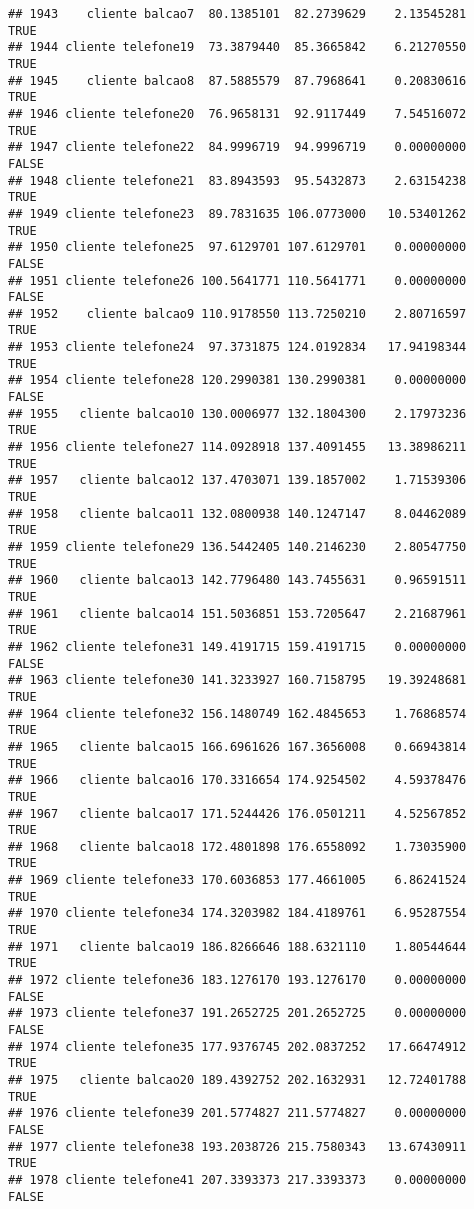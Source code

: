 \documentclass[
]{article}
\begin{document}
\begin{verbatim}
## 1943    cliente balcao7  80.1385101  82.2739629    2.13545281     TRUE
## 1944 cliente telefone19  73.3879440  85.3665842    6.21270550     TRUE
## 1945    cliente balcao8  87.5885579  87.7968641    0.20830616     TRUE
## 1946 cliente telefone20  76.9658131  92.9117449    7.54516072     TRUE
## 1947 cliente telefone22  84.9996719  94.9996719    0.00000000    FALSE
## 1948 cliente telefone21  83.8943593  95.5432873    2.63154238     TRUE
## 1949 cliente telefone23  89.7831635 106.0773000   10.53401262     TRUE
## 1950 cliente telefone25  97.6129701 107.6129701    0.00000000    FALSE
## 1951 cliente telefone26 100.5641771 110.5641771    0.00000000    FALSE
## 1952    cliente balcao9 110.9178550 113.7250210    2.80716597     TRUE
## 1953 cliente telefone24  97.3731875 124.0192834   17.94198344     TRUE
## 1954 cliente telefone28 120.2990381 130.2990381    0.00000000    FALSE
## 1955   cliente balcao10 130.0006977 132.1804300    2.17973236     TRUE
## 1956 cliente telefone27 114.0928918 137.4091455   13.38986211     TRUE
## 1957   cliente balcao12 137.4703071 139.1857002    1.71539306     TRUE
## 1958   cliente balcao11 132.0800938 140.1247147    8.04462089     TRUE
## 1959 cliente telefone29 136.5442405 140.2146230    2.80547750     TRUE
## 1960   cliente balcao13 142.7796480 143.7455631    0.96591511     TRUE
## 1961   cliente balcao14 151.5036851 153.7205647    2.21687961     TRUE
## 1962 cliente telefone31 149.4191715 159.4191715    0.00000000    FALSE
## 1963 cliente telefone30 141.3233927 160.7158795   19.39248681     TRUE
## 1964 cliente telefone32 156.1480749 162.4845653    1.76868574     TRUE
## 1965   cliente balcao15 166.6961626 167.3656008    0.66943814     TRUE
## 1966   cliente balcao16 170.3316654 174.9254502    4.59378476     TRUE
## 1967   cliente balcao17 171.5244426 176.0501211    4.52567852     TRUE
## 1968   cliente balcao18 172.4801898 176.6558092    1.73035900     TRUE
## 1969 cliente telefone33 170.6036853 177.4661005    6.86241524     TRUE
## 1970 cliente telefone34 174.3203982 184.4189761    6.95287554     TRUE
## 1971   cliente balcao19 186.8266646 188.6321110    1.80544644     TRUE
## 1972 cliente telefone36 183.1276170 193.1276170    0.00000000    FALSE
## 1973 cliente telefone37 191.2652725 201.2652725    0.00000000    FALSE
## 1974 cliente telefone35 177.9376745 202.0837252   17.66474912     TRUE
## 1975   cliente balcao20 189.4392752 202.1632931   12.72401788     TRUE
## 1976 cliente telefone39 201.5774827 211.5774827    0.00000000    FALSE
## 1977 cliente telefone38 193.2038726 215.7580343   13.67430911     TRUE
## 1978 cliente telefone41 207.3393373 217.3393373    0.00000000    FALSE

\end{verbatim}
\end{document}
